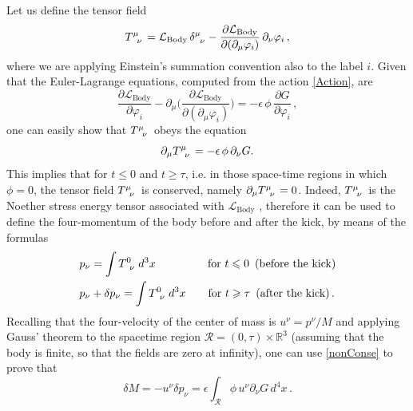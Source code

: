 \documentclass[twocolumn,usenatbib]{mnras2}
\newcommand{\spc}{\quad \quad \quad}
\begin{document}
Let us define the tensor field 
\begin{equation}
T\indices{^\mu _\nu} = \mathcal{L}_{\text{Body}} \, \delta\indices{^\mu _\nu} -\dfrac{\partial \mathcal{L}_{\text{Body}}}{\partial(\partial_\mu \varphi_i)} \, \partial_\nu \varphi_i  \, ,
\end{equation}
where we are applying Einstein's summation convention also to the label $i$. Given that the Euler-Lagrange equations, computed from the action \eqref{Action}, are
\begin{equation}
  \dfrac{\partial \mathcal{L}_{\text{Body}}}{\partial \varphi_i} - \partial_\mu \bigg( \dfrac{\partial \mathcal{L}_{\text{Body}}}{\partial(\partial_\mu \varphi_i)} \bigg) = -\epsilon \, \phi \, \dfrac{\partial G}{\partial \varphi_i} \, ,
\end{equation}
one can easily show that $T\indices{^\mu _\nu}$ obeys the equation
\begin{equation}\label{nonConse}
\partial_\mu T\indices{^\mu _\nu} = -\epsilon \, \phi \, \partial_\nu G.
\end{equation}
This implies that for $t \leq 0$ and $t \geq \tau$, i.e. in those space-time regions in which $\phi=0$, the tensor field $T\indices{^\mu _\nu}$ is conserved, namely $\partial_\mu T\indices{^\mu _\nu} =0$. Indeed, $T\indices{^\mu _\nu}$ is the Noether stress energy tensor associated with $\mathcal{L}_{\text{Body}}$ \citep{Weinberg_QFT_1995}, therefore it can be used to define the four-momentum of the body before and after the kick, by means of the formulas
\begin{equation}
\begin{split}
& p_\nu = \int T\indices{^0 _\nu} \, d^3 x  \spc \quad \, \, \, \,  \text{for }t \leq 0 \, \text{ (before the kick)} \\
& p_\nu + \delta p_\nu = \int T\indices{^0 _\nu} \, d^3 x  \quad \quad \text{for }t \geq \tau \, \text{ (after the kick)} \, . \\
\end{split}
\end{equation}
Recalling that the four-velocity of the center of mass is $u^\nu =p^\nu/M$ and applying Gauss' theorem to the spacetime region $\mathcal{R}=(0,\tau)\times \mathbb{R}^3$ (assuming that the body is finite, so that the fields are zero at infinity), one can use \eqref{nonConse} to prove that
\begin{equation}\label{hisguz}
    \delta M = -u^\nu \delta p_\nu = \epsilon \int_{\mathcal{R}}   \phi \, u^\nu \partial_\nu G \, d^4 x \, .
\end{equation}
\end{document}
